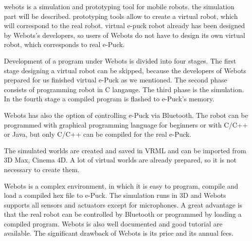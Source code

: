   webots is a simulation and prototyping tool for mobile robots.
  the simulation part will be described.  prototyping tools allow to create a virtual robot,
  which will correspond to the real robot.
  virtual e-puck robot already has been designed
  by Webots's developers, so users of Webots do not have to design its own virtual robot, 
  which corresponds to real e-Puck.
  
  Development of a program under Webots is divided into four stages. 
  The first stage designing a virtual robot can be skipped,
  because the developers of Webots prepared for us finished virtual e-Puck as we mentioned.
  The second phase consists of programming robot in C langauge. 
  The third phase is the simulation. In the fourth stage a compiled program is flashed to e-Puck's memory.
  
  Webots has also the option of controlling e-Puck via Bluetooth.
  The robot can be programmed with graphical programming language for beginners or with C/C++ or Java,
  but only C/C++ can be compiled for the real e-Puck.
  
  The simulated worlds are created and saved in VRML and can be imported 
  from 3D Max, Cinema 4D.
  A lot of virtual worlds are already prepared, so it is not necessary to create them.
  
  Webots is a complex environment, in which it is easy to program, compile and load 
  a compiled hex file to e-Puck.
  The simulation runs in 3D and Webots supports all sensors and actuators except for microphones.
  A great advantage is that the real robot can be controlled by Bluetooth or
  programmed by loading a compiled program.
  Webots is also well documented and good tutorial are available.
  The significant drawback of Webots is its price and its annual fees.
  
